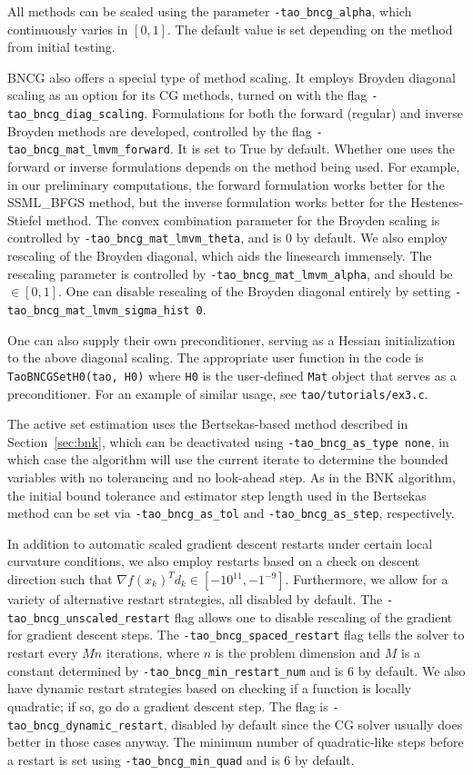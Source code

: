 \documentclass[]{book}
\begin{document}
All methods can be scaled using the parameter {\tt -tao\_bncg\_alpha}, which continuously
 varies in $[0, 1]$. The default value is set depending on the method from initial testing.

BNCG also offers a special type of method scaling. It employs Broyden diagonal scaling
as an option for its CG methods, turned on with the flag {\tt -tao\_bncg\_diag\_scaling}. Formulations for both the forward (regular) and inverse Broyden methods are developed,
 controlled by the flag {\tt -tao\_bncg\_mat\_lmvm\_forward}. It is set to True 
by default. Whether one uses the forward
or inverse formulations depends on the method being used. For example, in our preliminary computations,
the forward formulation works better for the SSML\_BFGS method, but the inverse formulation
works better for the Hestenes-Stiefel method. The convex combination parameter for the
 Broyden scaling is controlled by {\tt -tao\_bncg\_mat\_lmvm\_theta}, and is 0 by default. We also
employ rescaling of the Broyden diagonal, which aids the linesearch immensely. 
The rescaling parameter is controlled by {\tt -tao\_bncg\_mat\_lmvm\_alpha}, 
and should be $\in [0, 1]$. One can disable rescaling of the Broyden diagonal entirely by
 setting {\tt -tao\_bncg\_mat\_lmvm\_sigma\_hist 0}.

One can also supply their own preconditioner, serving as a Hessian initialization to
 the above diagonal scaling.
The appropriate user function in the code is {\tt TaoBNCGSetH0(tao, H0)} where 
{\tt H0} is the user-defined {\tt Mat} object that serves as a preconditioner. 
For an example of similar usage, see {\tt tao/tutorials/ex3.c}.

The active set estimation uses the Bertsekas-based method described in Section~\ref{sec:bnk},
which can be deactivated using {\tt -tao\_bncg\_as\_type none}, in which case the 
algorithm will use the current iterate to determine the bounded variables with no tolerancing 
and no look-ahead step. As in the BNK algorithm, the initial bound tolerance and estimator
step length used in the Bertsekas method can be set via {\tt -tao\_bncg\_as\_tol} and 
{\tt -tao\_bncg\_as\_step}, respectively.

In addition to automatic scaled gradient descent restarts under certain local curvature conditions,
we also employ restarts based on a check on descent direction 
such that $\nabla f(x_k)^T d_k \in [-10^{11}, -1^{-9}]$.
Furthermore, we allow for a variety of alternative restart strategies, 
all disabled by default.
The {\tt -tao\_bncg\_unscaled\_restart} flag allows one to 
disable rescaling of the gradient for
gradient descent steps. The {\tt -tao\_bncg\_spaced\_restart} flag tells the 
solver to restart every $Mn$ iterations,
where $n$ is the problem dimension and $M$ is a constant 
determined by {\tt -tao\_bncg\_min\_restart\_num} and is
6 by default. We also have dynamic restart strategies based on 
checking if a function is locally quadratic; if so,
go do a gradient descent step. The flag is {\tt -tao\_bncg\_dynamic\_restart}, 
disabled by default since the CG
solver usually does better in those cases anyway. 
The minimum number of quadratic-like steps before a restart is 
set using {\tt -tao\_bncg\_min\_quad} and is 6 by default. 
\end{document}
